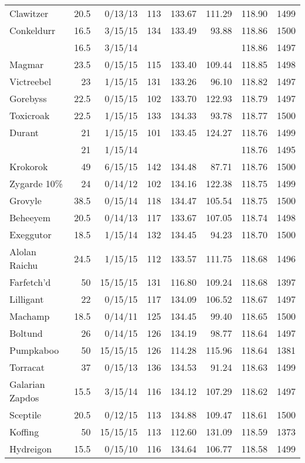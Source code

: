 \begin{longtable}{lrrrrrrr}
Clawitzer & 20.5 & 0/13/13 & 113 & 133.67 & 111.29 & 118.90 & 1499\\
Conkeldurr & 16.5 & 3/15/15 & 134 & 133.49 & 93.88 & 118.86 & 1500\\
 & 16.5 & 3/15/14 & & & & 118.86 & 1497\\
Magmar & 23.5 & 0/15/15 & 115 & 133.40 & 109.44 & 118.85 & 1498\\
Victreebel & 23 & 1/15/15 & 131 & 133.26 & 96.10 & 118.82 & 1497\\
Gorebyss & 22.5 & 0/15/15 & 102 & 133.70 & 122.93 & 118.79 & 1497\\
Toxicroak & 22.5 & 1/15/15 & 133 & 134.33 & 93.78 & 118.77 & 1500\\
Durant & 21 & 1/15/15 & 101 & 133.45 & 124.27 & 118.76 & 1499\\
 & 21 & 1/15/14 & & & & 118.76 & 1495\\
Krokorok & 49 & 6/15/15 & 142 & 134.48 & 87.71 & 118.76 & 1500\\
Zygarde 10\% & 24 & 0/14/12 & 102 & 134.16 & 122.38 & 118.75 & 1499\\
Grovyle & 38.5 & 0/15/14 & 118 & 134.47 & 105.54 & 118.75 & 1500\\
Beheeyem & 20.5 & 0/14/13 & 117 & 133.67 & 107.05 & 118.74 & 1498\\
Exeggutor & 18.5 & 1/15/14 & 132 & 134.45 & 94.23 & 118.70 & 1500\\
Alolan Raichu & 24.5 & 1/15/15 & 112 & 133.57 & 111.75 & 118.68 & 1496\\
Farfetch'd & 50 & 15/15/15 & 131 & 116.80 & 109.24 & 118.68 & 1397\\
Lilligant & 22 & 0/15/15 & 117 & 134.09 & 106.52 & 118.67 & 1497\\
Machamp & 18.5 & 0/14/11 & 125 & 134.45 & 99.40 & 118.65 & 1500\\
Boltund & 26 & 0/14/15 & 126 & 134.19 & 98.77 & 118.64 & 1497\\
Pumpkaboo & 50 & 15/15/15 & 126 & 114.28 & 115.96 & 118.64 & 1381\\
Torracat & 37 & 0/15/13 & 136 & 134.53 & 91.24 & 118.63 & 1499\\
Galarian Zapdos & 15.5 & 3/15/14 & 116 & 134.12 & 107.29 & 118.62 & 1497\\
Sceptile & 20.5 & 0/12/15 & 113 & 134.88 & 109.47 & 118.61 & 1500\\
Koffing & 50 & 15/15/15 & 113 & 112.60 & 131.09 & 118.59 & 1373\\
Hydreigon & 15.5 & 0/15/10 & 116 & 134.64 & 106.77 & 118.58 & 1499\\

\end{longtable}
